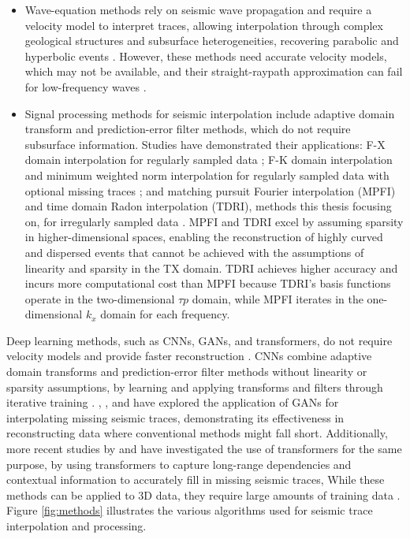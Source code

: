 \begin{itemize}
\item Wave-equation methods rely on seismic wave propagation and require a velocity model to interpret traces, allowing interpolation through complex geological structures and subsurface heterogeneities, recovering parabolic and hyperbolic events \cite{ronen1987wave}. However, these methods need accurate velocity models, which may not be available, and their straight-raypath approximation can fail for low-frequency waves \cite{stolt2002seismic}. 
\item Signal processing methods for seismic interpolation include adaptive domain transform and prediction-error filter methods, which do not require subsurface information. Studies have demonstrated their applications: F-X domain interpolation for regularly sampled data \cite{spitz1991seismic}; F-K domain interpolation and minimum weighted norm interpolation for regularly sampled data with optional missing traces \cite{naghizadeh2012seismic,liu2004minimum}; and matching pursuit Fourier interpolation (MPFI) and time domain Radon interpolation (TDRI), methods this thesis focusing on, for irregularly sampled data \cite{schonewille2013matching,schonewille2014comparison}. MPFI and TDRI excel by assuming sparsity in higher-dimensional spaces, enabling the reconstruction of highly curved and dispersed events that cannot be achieved with the assumptions of linearity and sparsity in the TX domain. TDRI achieves higher accuracy and incurs more computational cost than MPFI because TDRI's basis functions operate in the two-dimensional $\tau p$ domain, while MPFI iterates in the one-dimensional $k_x$ domain for each frequency.
\end{itemize}

\noindent Deep learning methods, such as CNNs, GANs, and transformers, do not require velocity models and provide faster reconstruction \cite{kaur2019seismic, kaur2021seismic, gao2024swin}. CNNs combine adaptive domain transforms and prediction-error filter methods without linearity or sparsity assumptions, by learning and applying transforms and filters through iterative training \cite{oliveira2018interpolating}. , , and  have explored the application of GANs for interpolating missing seismic traces, demonstrating its effectiveness in reconstructing data where conventional methods might fall short. Additionally, more recent studies by  and  have investigated the use of transformers for the same purpose, by using transformers to capture long-range dependencies and contextual information to accurately fill in missing seismic traces, While these methods can be applied to 3D data, they require large amounts of training data \cite{khosro2023machine}. Figure \ref{fig:methods} illustrates the various algorithms used for seismic trace interpolation and processing. 

